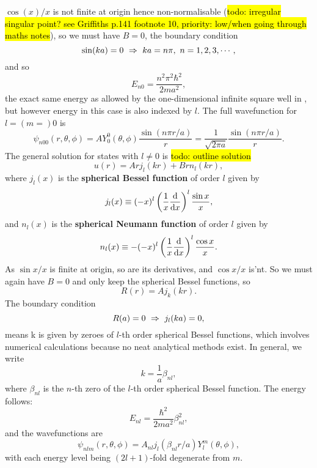 $\cos(x)/x$ is not finite at origin hence non-normalisable (\hl{todo: irregular singular point? see Griffiths p.141 footnote 10, priority: low/when going through maths notes}), so we must have $B=0$, the boundary condition 
\begin{equation}
\sin(ka)=0\ \imp\ ka=n\pi,\ n=1,2,3,\cdots,
\end{equation}
and so
\begin{equation}
E_{n0}=\frac{n^2\pi^2\hbar^2}{2ma^2}, 
\end{equation}
the exact same energy as allowed by the one-dimensional infinite square well in 
, but however energy in this case is also indexed by $l$. 
The full wavefunction for $l=(m=)0$ is 
\begin{equation}
\psi_{n00}(r,\theta,\phi)=AY^0_0(\theta,\phi)\frac{\sin(n\pi r/a)}{r}=\frac{1}{\sqrt{2\pi a}}\frac{\sin(n\pi r/a)}{r}.
\end{equation}
The general solution for states with $l\neq0$ is \hl{todo: outline solution}
\begin{equation}
u(r)=Arj_l(kr)+Brn_l(kr), 
\end{equation}
where $j_l(x)$ is the \textbf{spherical Bessel function} of order $l$ given by
\begin{equation}
j_l(x)\equiv(-x)^l\lf(\frac{1}{x}\diff{}{x} \rt)^l\frac{\sin x}{x} ,
\end{equation}
and $n_l(x)$ is the \textbf{spherical Neumann function} of order $l$ given by 
\begin{equation}
n_l(x)\equiv-(-x)^l\lf(\frac{1}{x}\diff{}{x} \rt)^l\frac{\cos x}{x}.
\end{equation}
As $\sin x/x$ is finite at origin, so are its derivatives, and $\cos x/x$ is'nt. 
So we must again have $B=0$ and only keep the spherical Bessel functions, so
\begin{equation}
R(r)=Aj_k(kr).
\end{equation}
The boundary condition
\begin{equation}
R(a)=0\ \imp\ j_l(ka)=0,
\end{equation}
means k is given by zeroes of $l$-th order spherical Bessel functions, which 
involves numerical calculations because no neat analytical methods exist. 
In general, we write
\begin{equation}
k=\frac{1}{a}\beta_{nl},
\end{equation}
where $\beta_{nl}$ is the $n$-th zero of the $l$-th order spherical Bessel function. The energy follows:
\begin{equation}
E_{nl}=\frac{\hbar^2}{2ma^2}\beta^2_{nl},
\end{equation}
and the wavefunctions are
\begin{equation}
\psi_{nlm}(r,\theta,\phi)=A_{nl}j_l(\beta_{nl}r/a)Y^m_l(\theta,\phi),
\end{equation}
with each energy level being $(2l+1)$-fold degenerate from $m$. 
